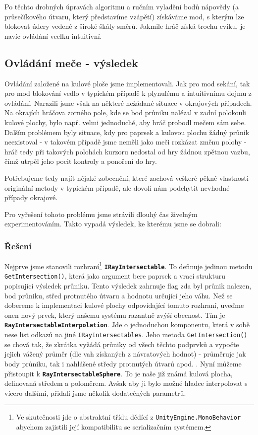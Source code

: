 \bigbreak

Po těchto drobných úpravách algoritmu a ručním vyladění bodů nápovědy (a průsečíkového útvaru, který představíme vzápětí) získáváme mod, s kterým lze blokovat údery vedené z široké škály směrů. Jakmile hráč získá trochu cviku, je navíc ovládání vcelku intuitivní.

\subsection{Ovládání meče - výsledek} \label{rayIntersectablesDefinitionSubsection}

Ovládání založené na kulové ploše jsme implementovali. Jak pro mod sekání, tak pro mod blokování vedlo v typickém případě k plynulému a intuitivnímu dojmu z ovládání. Narazili jsme však na některé nežádané situace v okrajových případech. Na okrajích hráčova zorného pole, kde se bod průniku nalézal v zadní polokouli kulové plochy, bylo např. velmi jednoduché, aby hráč probodl mečem sám sebe. Dalším problémem byly situace, kdy pro paprsek a kulovou plochu žádný průnik neexistoval - v takovém případě jsme neměli jako meči rozkázat změnu polohy - hráč tedy při takových polohách kurzoru nedostal od hry žádnou zpětnou vazbu, čímž utrpěl jeho pocit kontroly a ponoření do hry.

Potřebujeme tedy najít nějaké zobecnění, které zachová veškeré pěkné vlastnosti originální metody v typickém případě, ale dovolí nám podchytit nevhodné případy okrajové.

Pro vyřešení tohoto problému jsme strávili dlouhý čas živelným experimentováním. Takto vypadá výsledek, ke kterému jsme se dobrali:

\subsubsection*{Řešení} \label{resultSwordControlsSolutionSubsubsection}

Nejprve jsme stanovili rozhraní\footnote{Ve skutečnosti jde o abstraktní třídu dědící z \texttt{UnityEngine.MonoBehavior} abychom zajistili její kompatibilitu se serializačním systémem.} \textbf{\texttt{IRayIntersectable}}. To definuje jedinou metodu \texttt{GetIntersection()}, která jako argument bere paprsek a vrací strukturu popisující výsledek průniku. Tento výsledek zahrnuje flag zda byl průnik nalezen, bod průniku, střed protnutého útvaru a hodnotu určující jeho váhu.
\bigbreak
Než se dobereme k implementaci kulové plochy odpovídající tomuto rozhraní, uveďme onen nový prvek, který našemu systému razantně zvýší obecnost. Tím je \textbf{\texttt{RayIntersectableInterpolation}}. Jde o jednoduchou komponentu, která v sobě nese list odkazů na jiné \texttt{IRayIntersectables}. Jeho metoda \texttt{GetIntersection()} se chová tak, že zkrátka vyžádá průniky od všech těchto podprvků a vypočte jejich vážený průměr (dle vah získaných z návratových hodnot) - průměruje jak body průniku, tak i nahlášené středy protnutých útvarů apod. .
\bigbreak
Nyní můžeme přistoupit k \textbf{\texttt{RayIntersectableSphere}}. To je naše již známá kulová plocha, definovaná středem a poloměrem. Avšak aby ji bylo možné hladce interpolovat s vícero dalšími, přidali jsme několik dodatečných parametrů.

